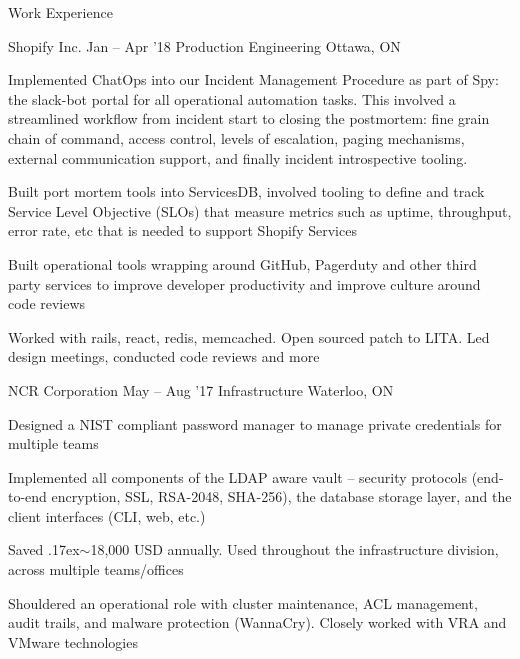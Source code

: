 \documentclass{resume} %
\begin{document}
\begin{rSection}{Work Experience}
  \begin{rSubsection}{Shopify Inc.}
		     {Jan -- Apr '18}
		     {Production Engineering}
		     {Ottawa, ON}
    \item Implemented ChatOps into our Incident Management Procedure as
      part of Spy: the slack-bot portal for all operational automation tasks.
      This involved a streamlined workflow from incident start to closing the
      postmortem: fine grain chain of command, access control, levels of
      escalation, paging mechanisms, external communication support, and finally
      incident introspective tooling. 
    \item Built port mortem tools into ServicesDB, involved tooling to define and
      track Service Level Objective (SLOs) that measure metrics such as uptime,
      throughput, error rate, etc that is needed to support Shopify Services
    \item Built operational tools wrapping around GitHub, Pagerduty and other
      third party services to improve developer productivity and improve culture
      around code reviews
    \item Worked with rails, react, redis, memcached. Open sourced patch to
      LITA. Led design meetings, conducted code reviews and more 
  \end{rSubsection}

  \begin{rSubsection}{NCR Corporation}
		     {May -- Aug '17}
		     {Infrastructure}
		     {Waterloo, ON}
    \item Designed a NIST compliant password manager to manage private
      credentials for multiple teams
    \item Implemented all components of the LDAP aware vault -- security
      protocols (end-to-end encryption, SSL, RSA-2048, SHA-256), the database
      storage layer, and the client interfaces (CLI, web, etc.)
    \item Saved {\raise.17ex\hbox{$\scriptstyle\mathtt{\sim}$}}18,000 USD
      annually. Used throughout the infrastructure division, across multiple
      teams/offices
    \item Shouldered an operational role with cluster maintenance, ACL management,
      audit trails, and malware protection (WannaCry). Closely worked with VRA
      and VMware technologies
  \end{rSubsection}
\end{rSection} 
\end{document}
